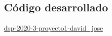 \appendix 
\subsection{Código desarrollado} \label{A:Code}

\href{https://github.com/coursesmichaelgruner/dsp-2020-3-proyecto1-david_jose}{dsp-2020-3-proyecto1-david\_jose}